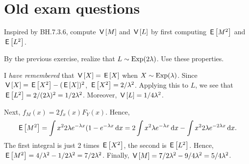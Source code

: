 



\chapter{Old  exam questions}

\begin{exercise}
Inspired by BH.7.3.6, compute $\,\mathsf{V}\left[M\right]$ and $\,\mathsf{V}\left[L\right]$ by first computing $\,\mathsf{E}\left[M^{2}\right]$ and $\,\mathsf{E}\left[L^{2}\right]$.
\begin{hint}
By the previous exercise, realize that $L\sim\mathrm{Exp}(2\lambda)$.  Use these properties.
\end{hint}
\begin{solution}
I \emph{have remembered} that $\,\mathsf{V}\left[X\right] = \,\mathsf{E}\left[X\right]$ when $X\sim \mathrm{Exp}(\lambda)$. Since $\,\mathsf{V}\left[X\right] = \,\mathsf{E}\left[X^{2}\right] - (\,\mathsf{E}\left[X\right])^{2}$, $\,\mathsf{E}\left[X^2\right]=2/\lambda^{2}$. Applying this to $L$, we see that $\,\mathsf{E}\left[L^2\right] = 2/(2\lambda)^{2} = 1/2\lambda^{2}$. Moreover, $\,\mathsf{V}\left[L\right] = 1/4\lambda^{2}$.

Next, $f_M(x) = 2 f_x(x) F_Y(x)$. Hence,
\begin{equation*}
\,\mathsf{E}\left[M^2\right] = \int x^2 2 \lambda e^{-\lambda x} (1-e^{-\lambda x}\,\textrm{d}x = 2 \int x^2  \lambda e^{-\lambda x} \,\textrm{d}x - \int x^{2} 2 \lambda e^{-2\lambda x}\,\textrm{d}x.
\end{equation*}
The first integral is just 2 times $\,\mathsf{E}\left[X^{2}\right]$, the second is $\,\mathsf{E}\left[L^2\right]$. Hence, $\,\mathsf{E}\left[M^2\right]=4/\lambda^2-1/2\lambda^2= 7/2\lambda^{2}$. Finally, $\,\mathsf{V}\left[M\right] = 7/2\lambda^2 - 9/4\lambda^2= 5/4\lambda^{2}$.
\end{solution}
\end{exercise}






